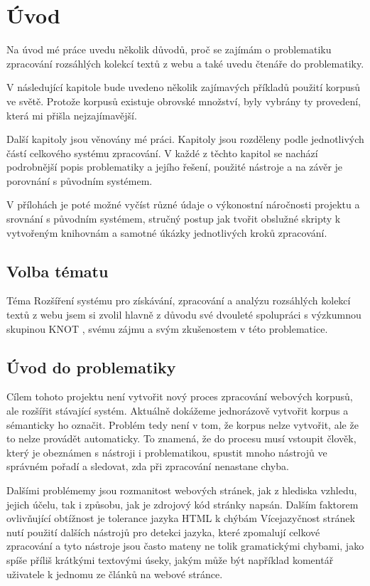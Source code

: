 
\chapter{Úvod}
Na úvod mé práce uvedu několik důvodů, proč se zajímám o problematiku zpracování
rozsáhlých kolekcí textů z webu a také uvedu čtenáře do problematiky.

V následující kapitole bude uvedeno několik zajímavých příkladů použití korpusů ve světě.
Protože korpusů existuje obrovské množství, byly vybrány ty provedení, která mi přišla
nejzajímavější.

Další kapitoly jsou věnovány mé práci. Kapitoly jsou rozděleny podle jednotlivých částí celkového
systému zpracování. V každé z těchto kapitol se nachází podrobnější popis
problematiky a jejího řešení, použité nástroje a na závěr je porovnání
s původním systémem.

V přílohách je poté možné vyčíst různé údaje o výkonostní náročnosti projektu a srovnání s původním systémem,
stručný postup jak tvořit obslužné skripty k vytvořeným knihovnám a
samotné úkázky jednotlivých kroků zpracování.

\section{Volba tématu}
Téma Rozšíření systému pro získávání, zpracování a analýzu rozsáhlých kolekcí textů z webu
jsem si zvolil hlavně z důvodu své dvouleté spolupráci s výzkumnou skupinou KNOT \cite{KNOT}, svému zájmu a
svým zkušenostem v této problematice.

\section{Úvod do problematiky}
Cílem tohoto projektu není vytvořit nový proces zpracování webových korpusů, ale rozšířit stávající
systém. Aktuálně dokážeme jednorázově vytvořit korpus a sémanticky ho označit. Problém tedy není v tom,
že korpus nelze vytvořit, ale že to nelze provádět automaticky. To znamená, že do procesu musí vstoupit
člověk, který je obeznámen s nástroji i problematikou, spustit mnoho nástrojů ve správném pořadí a
sledovat, zda při zpracování nenastane chyba.

Dalšími problémemy jsou rozmanitost webových stránek, jak z hlediska vzhledu, jejich účelu, tak i
způsobu, jak je zdrojový kód stránky napsán. Dalším faktorem ovlivňující obtížnost je tolerance jazyka HTML k chýbám
Vícejazyčnost stránek nutí použití dalších nástrojů pro detekci jazyka, které zpomalují celkové zpracování
a tyto nástroje jsou často mateny ne tolik gramatickými chybami, jako spíše příliš krátkými textovými úseky,
jakým může být například komentář uživatele k jednomu ze článků na webové stránce.

